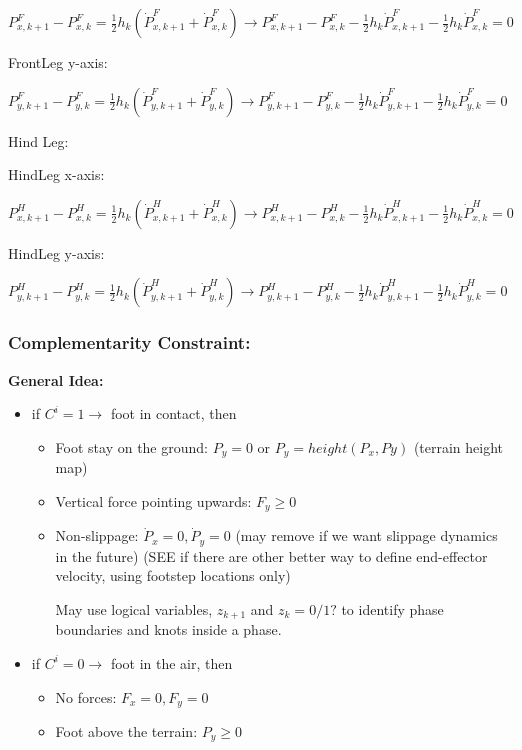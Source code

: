 \documentclass[a4paper,10pt]{article}
\begin{document}
$P^F_{x,k+1}-P^F_{x,k} = \frac{1}{2}h_k(\dot{P}^F_{x,k+1}+\dot{P}^F_{x,k}) \rightarrow P^F_{x,k+1}-P^F_{x,k} - \frac{1}{2}h_k\dot{P}^F_{x,k+1} - \frac{1}{2}h_k\dot{P}^F_{x,k}  = 0$

\vspace{2mm}

FrontLeg y-axis:

$P^F_{y,k+1}-P^F_{y,k} = \frac{1}{2}h_k(\dot{P}^F_{y,k+1}+\dot{P}^F_{y,k}) \rightarrow P^F_{y,k+1}-P^F_{y,k} - \frac{1}{2}h_k\dot{P}^F_{y,k+1} - \frac{1}{2}h_k\dot{P}^F_{y,k}  = 0$

\vspace{3mm}

Hind Leg:

HindLeg x-axis:

$P^H_{x,k+1}-P^H_{x,k} = \frac{1}{2}h_k(\dot{P}^H_{x,k+1}+\dot{P}^H_{x,k}) \rightarrow P^H_{x,k+1}-P^H_{x,k} - \frac{1}{2}h_k\dot{P}^H_{x,k+1} - \frac{1}{2}h_k\dot{P}^H_{x,k}  = 0$

\vspace{2mm}

HindLeg y-axis:

$P^H_{y,k+1}-P^H_{y,k} = \frac{1}{2}h_k(\dot{P}^H_{y,k+1}+\dot{P}^H_{y,k}) \rightarrow P^H_{y,k+1}-P^H_{y,k} - \frac{1}{2}h_k\dot{P}^H_{y,k+1} - \frac{1}{2}h_k\dot{P}^H_{y,k}  = 0$

\vspace{3mm}

\subsubsection{Complementarity Constraint:}
\vspace{2mm}

\textbf{General Idea:}

\begin{itemize}
	\item if $C^i = 1 \rightarrow $ foot in contact, then
		
		\begin{itemize}
			\item Foot stay on the ground: $P_y = 0$ or $P_y = height(P_x,Py)$ (terrain height map)
			\item Vertical force pointing upwards: $F_y \geq 0$
			\item Non-slippage: $\dot{P}_x = 0, \dot{P}_y =0$ (may remove if we want slippage dynamics in the future) (SEE if there are other better way to define end-effector velocity, using footstep locations only)
			
			May use logical variables, $z_{k+1}$ and $z_{k} = 0/1?$ to identify phase boundaries and knots inside a phase.
		\end{itemize}
	
	\item if $C^i =0 \rightarrow $ foot in the air, then
	
		\begin{itemize}
			\item No forces: $F_x = 0, F_y =0$
			\item Foot above the terrain: $P_y \geq 0$
		\end{itemize}
\end{itemize}
\end{document}
